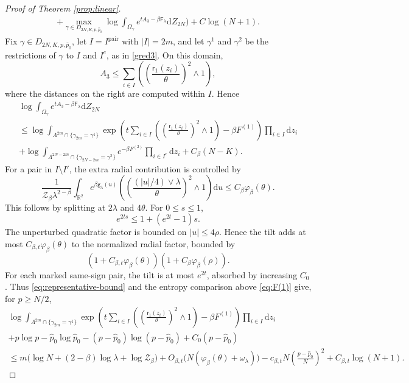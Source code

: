 \documentclass[a4paper,10pt,leqno]{amsart}
\numberwithin{equation}{section}
\newcommand{\R}{\mathbb{R}}
\newcommand{\dd}{\mathrm{d}}
\def\mc{\mathcal}
\def\g{\mathsf{g}}
\def\F{\mathsf{F}}
\def\rr{\mathsf{r}}
\def\pair{\mathrm{pair}}
\begin{document}
\begin{proof}[Proof of Theorem \ref{prop:linear}]
\begin{multline*}
    +\max_{\gamma\in D_{2N,K,p,\widehat p_0}}
    \log\int_{\Omega_{\gamma}}e^{tA_3-\beta\F_\lambda}\dd Z_{2N}\Bigg)+C\log(N+1).
  \end{multline*}
  Fix $\gamma\in D_{2N,K,p,\widehat p_0}$, let $I=I^{\pair}$ with $|I|=2m$, and let $\gamma^1$ and $\gamma^2$ be the restrictions of $\gamma$ to $I$ and $I^c$, as in \eqref{gred3}. On this domain,
  \[
    A_3\le\sum_{i\in I}\left(\left(\frac{\rr_1(z_i)}{\theta}\right)^2\wedge1\right),
  \]
  where the distances on the right are computed within $I$. Hence
  \begin{multline*}
    \log\int_{\Omega_{\gamma}}e^{tA_3-\beta\F_\lambda}\dd Z_{2N}\\
    \le\log\int_{\Lambda^{2m}\cap\{\gamma_{2m}=\gamma^1\}}
    \exp\left(t\sum_{i\in I}\left(\left(\frac{\rr_1(z_i)}{\theta}\right)^2\wedge1\right)-\beta F^{(1)}\right)\prod_{i\in I}\dd z_i\\
    +\log\int_{\Lambda^{2N-2m}\cap\{\gamma_{2N-2m}=\gamma^2\}}e^{-\beta F^{(2)}}\prod_{i\in I^c}\dd z_i+C_\beta(N-K).
  \end{multline*}
  For a pair in $I\setminus I'$, the extra radial contribution is controlled by
  \[
    \frac{1}{\mc Z_\beta\lambda^{2-\beta}}
    \int_{\R^2}e^{\beta\g_\lambda(u)}
    \left(\left(\frac{(|u|/4)\vee\lambda}{\theta}\right)^2\wedge1\right)\dd u
    \le C_\beta\varphi_\beta(\theta).
  \]
  This follows by splitting at $2\lambda$ and $4\theta$. For $0\le s\le1$,
  \[
    e^{2ts}\le1+(e^{2t}-1)s.
  \]
  The unperturbed quadratic factor is bounded on $|u|\le4\rho$. Hence the tilt adds at most $C_{\beta,t}\varphi_\beta(\theta)$ to the normalized radial factor, bounded by
  \[
    (1+C_{\beta,t}\varphi_\beta(\theta))(1+C_\beta\varphi_\beta(\rho)).
  \]
  For each marked same-sign pair, the tilt is at most $e^{2t}$, absorbed by increasing $C_0$. Thus \eqref{eq:representative-bound} and the entropy comparison above \eqref{eq:F(1)} give, for $p\ge N/2$,
  \begin{multline*}
    \log\int_{\Lambda^{2m}\cap\{\gamma_{2m}=\gamma^1\}}
    \exp\left(t\sum_{i\in I}\left(\left(\frac{\rr_1(z_i)}{\theta}\right)^2\wedge1\right)-\beta F^{(1)}\right)\prod_{i\in I}\dd z_i\\
    +p\log p-\widehat p_0\log \widehat p_0-(p-\widehat p_0)\log(p-\widehat p_0)+C_0(p-\widehat p_0)\\
    \le m\bigl(\log N+(2-\beta)\log\lambda+\log\mc Z_\beta\bigr)
    +O_{\beta,t}\bigl(N(\varphi_\beta(\theta)+\omega_\lambda)\bigr)
    -c_{\beta,t}N\left(\frac{p-\widehat p_0}{N}\right)^2+C_{\beta,t}\log(N+1).

\end{multline*}
\end{proof}
\end{document}
